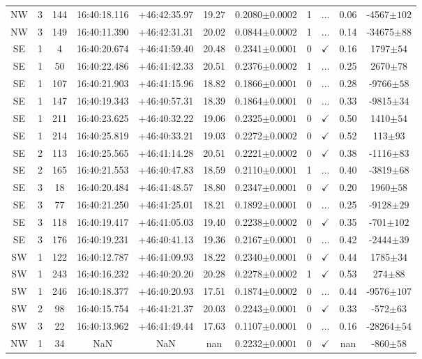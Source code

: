 \begin{table*}
\begin{tabular}{ccccccccccc}
NW & 3 & 144 & 16:40:18.116 & +46:42:35.97 & 19.27 & 0.2080$\pm{0.0002}$ & 1 & ... & 0.06 & -4567$\pm{102}$ \\
NW & 3 & 149 & 16:40:11.390 & +46:42:31.31 & 20.02 & 0.0844$\pm{0.0002}$ & 1 & ... & 0.14 & -34675$\pm{88}$ \\
SE & 1 & 4 & 16:40:20.674 & +46:41:59.40 & 20.48 & 0.2341$\pm{0.0001}$ & 0 & $\checkmark$ & 0.16 & 1797$\pm{54}$ \\
SE & 1 & 50 & 16:40:22.486 & +46:41:42.33 & 20.51 & 0.2376$\pm{0.0002}$ & 1 & ... & 0.25 & 2670$\pm{78}$ \\
SE & 1 & 107 & 16:40:21.903 & +46:41:15.96 & 18.82 & 0.1866$\pm{0.0001}$ & 0 & ... & 0.28 & -9766$\pm{58}$ \\
SE & 1 & 147 & 16:40:19.343 & +46:40:57.31 & 18.39 & 0.1864$\pm{0.0001}$ & 0 & ... & 0.33 & -9815$\pm{34}$ \\
SE & 1 & 211 & 16:40:23.625 & +46:40:32.22 & 19.06 & 0.2325$\pm{0.0001}$ & 0 & $\checkmark$ & 0.50 & 1410$\pm{54}$ \\
SE & 1 & 214 & 16:40:25.819 & +46:40:33.21 & 19.03 & 0.2272$\pm{0.0002}$ & 0 & $\checkmark$ & 0.52 & 113$\pm{93}$ \\
SE & 2 & 113 & 16:40:25.565 & +46:41:14.28 & 20.51 & 0.2221$\pm{0.0002}$ & 0 & $\checkmark$ & 0.38 & -1116$\pm{83}$ \\
SE & 2 & 165 & 16:40:21.553 & +46:40:47.83 & 18.59 & 0.2110$\pm{0.0001}$ & 1 & ... & 0.40 & -3819$\pm{68}$ \\
SE & 3 & 18 & 16:40:20.484 & +46:41:48.57 & 18.80 & 0.2347$\pm{0.0001}$ & 0 & $\checkmark$ & 0.20 & 1960$\pm{58}$ \\
SE & 3 & 77 & 16:40:21.250 & +46:41:25.01 & 18.21 & 0.1892$\pm{0.0001}$ & 0 & ... & 0.25 & -9128$\pm{29}$ \\
SE & 3 & 118 & 16:40:19.417 & +46:41:05.03 & 19.40 & 0.2238$\pm{0.0002}$ & 0 & $\checkmark$ & 0.35 & -701$\pm{102}$ \\
SE & 3 & 176 & 16:40:19.231 & +46:40:41.13 & 19.36 & 0.2167$\pm{0.0001}$ & 0 & ... & 0.42 & -2444$\pm{39}$ \\
SW & 1 & 122 & 16:40:12.787 & +46:41:09.93 & 18.22 & 0.2340$\pm{0.0001}$ & 0 & $\checkmark$ & 0.44 & 1785$\pm{34}$ \\
SW & 1 & 243 & 16:40:16.232 & +46:40:20.20 & 20.28 & 0.2278$\pm{0.0002}$ & 1 & $\checkmark$ & 0.53 & 274$\pm{88}$ \\
SW & 1 & 246 & 16:40:18.377 & +46:40:20.93 & 17.51 & 0.1874$\pm{0.0002}$ & 0 & ... & 0.44 & -9576$\pm{107}$ \\
SW & 2 & 98 & 16:40:15.754 & +46:41:21.37 & 20.03 & 0.2243$\pm{0.0001}$ & 0 & $\checkmark$ & 0.33 & -572$\pm{63}$ \\
SW & 3 & 22 & 16:40:13.962 & +46:41:49.44 & 17.63 & 0.1107$\pm{0.0001}$ & 0 & ... & 0.16 & -28264$\pm{54}$ \\
NW & 1 & 34 & NaN & NaN & nan & 0.2232$\pm{0.0001}$ & 0 & $\checkmark$ & nan & -860$\pm{58}$ \\
			\hline
		\end{tabular}
		\label{tbl:c250p08+46p7}
	\end{table*}


